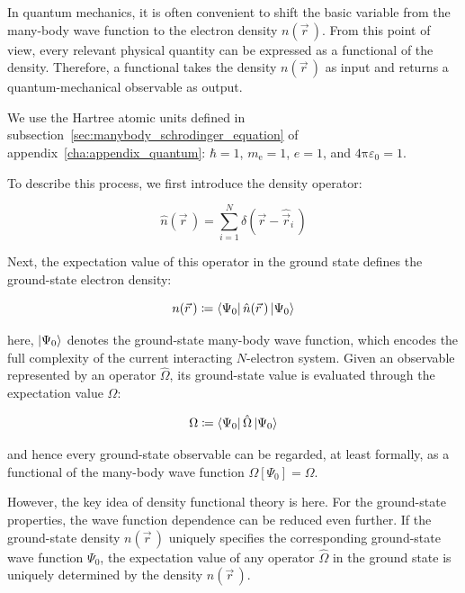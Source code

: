 In quantum mechanics, it is often convenient to shift the basic variable from the many-body wave function to the electron density $n(\vec{r}\,)$.
From this point of view, every relevant physical quantity can be expressed as a functional of the density.
Therefore, a functional takes the density $n(\vec{r}\,)$ as input and returns a quantum-mechanical observable as output.

We use the Hartree atomic units defined in subsection~\ref{sec:manybody_schrodinger_equation} of appendix~\ref{cha:appendix_quantum}:
$\hbar=1$, $m_\mathrm{e}=1$, $e=1$, and $4\mathrm{\pi}\varepsilon_0=1$.

To describe this process, we first introduce the density operator:

\begin{equation}
    \hat{n}(\vec{r}\,) = \sum_{i=1}^N \delta(\vec{r}-\hat{\vec{r}}_i\,)
\label{density_operator}
\end{equation}

Next, the expectation value of this operator in the ground state defines the ground-state electron density:

\begin{equation}
    n(\vec{r}\,)\coloneqq\bra{\Psi_0}\hat{n}(\vec{r}\,)\ket{\Psi_0}
\label{electron_density_definition}
\end{equation}

here, $\ket{\Psi_0}$ denotes the ground-state many-body wave function, which encodes the full complexity of the current interacting $N$-electron system.
Given an observable represented by an operator $\hat{\Omega}$, its ground-state value is evaluated through the expectation value $\Omega$:

\begin{equation}
    \Omega \coloneqq \bra{\Psi_0}\hat{\Omega}\ket{\Psi_0}
\label{electron_density_expectation}
\end{equation}

and hence every ground-state observable can be regarded, at least formally, as a functional of the many-body wave function $\Omega[\Psi_0]=\Omega$.

However, the key idea of density functional theory is here.
For the ground-state properties, the wave function dependence can be reduced even further.
If the ground-state density $n(\vec{r}\,)$ uniquely specifies the corresponding ground-state wave function $\Psi_0$,
the expectation value of any operator $\hat{\Omega}$ in the ground state is uniquely determined by the density $n(\vec{r}\,)$.

